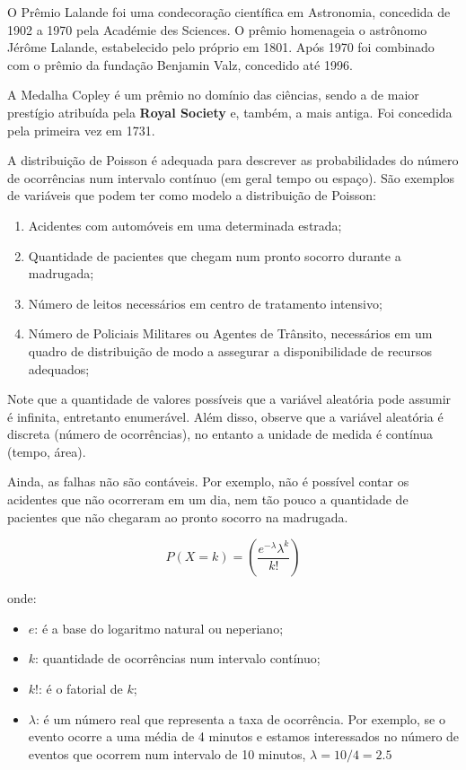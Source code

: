 O Prêmio Lalande foi uma condecoração científica em Astronomia, concedida de 1902 a 1970 pela Académie des Sciences. O prêmio homenageia o astrônomo Jérôme Lalande, estabelecido pelo próprio em 1801. Após 1970 foi combinado com o prêmio da fundação Benjamin Valz, concedido até 1996.\vskip0.3cm


A Medalha Copley é um prêmio no domínio das ciências, sendo
a de maior prestígio atribuída pela \textbf{Royal Society} e, também, a mais antiga. Foi concedida pela primeira vez em 1731.\vskip0.3cm


  
A distribuição de Poisson é adequada para descrever as probabilidades do número de ocorrências num intervalo contínuo (em geral tempo ou espaço). São exemplos de variáveis que podem ter como modelo a distribuição de Poisson:

\begin{enumerate}
    \item Acidentes com automóveis em uma determinada estrada;
    \item Quantidade de pacientes que chegam num pronto socorro durante a madrugada;
    \item  Número de leitos necessários em centro de tratamento intensivo;
    \item  Número de Policiais Militares ou Agentes de Trânsito, necessários em um quadro de distribuição de modo a assegurar a disponibilidade de recursos adequados;
\end{enumerate}


Note que a quantidade de valores possíveis que a variável aleatória pode assumir é infinita, entretanto enumerável. Além disso, observe que a variável aleatória é discreta (número de ocorrências), no entanto a unidade de medida é contínua (tempo, área).\vskip0.3cm

Ainda, as falhas não são contáveis. Por exemplo, não é possível contar os acidentes que não ocorreram em um dia, nem tão pouco a quantidade de pacientes que não chegaram ao pronto socorro na madrugada.
 
 
\begin{equation}
    P\left(X=k\right)= \left( \frac{e^{-\lambda}\lambda^{k}}{k!} \right)
\end{equation}

onde:

\begin{itemize}
\item $e$: é a base do logaritmo natural ou neperiano;
\item $k$: quantidade de ocorrências num intervalo contínuo;
\item $k!$: é o fatorial de $k$; 
\item $\lambda$: é um número real que representa a taxa de ocorrência. Por exemplo, se o evento ocorre a uma média de 4 minutos e estamos interessados no número de eventos que ocorrem num intervalo de 10 minutos, $\lambda={10}/{4}=2.5$
\end{itemize}

